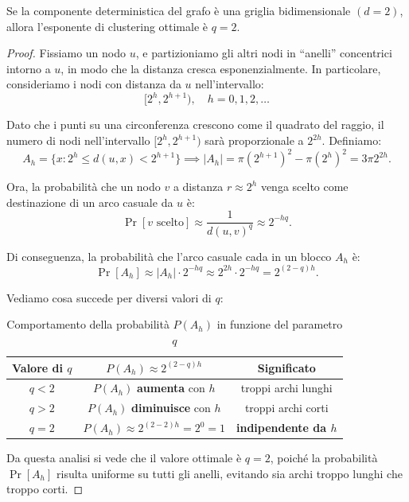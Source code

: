 \begin{teorema}[Informale: Coefficiente di clustering ottimale per $d = 2$]
    Se la componente deterministica del grafo è una griglia bidimensionale $(d = 2)$, allora l'esponente di clustering ottimale è $q = 2$.
\end{teorema}
\begin{proof}
    Fissiamo un nodo $u$, e partizioniamo gli altri nodi in “anelli” concentrici intorno a $u$, in modo che la distanza cresca esponenzialmente.  
    In particolare, consideriamo i nodi con distanza da $u$ nell'intervallo:
    \[
    [2^h, 2^{h+1}), \quad h = 0, 1, 2, \dots
    \]
    
    Dato che i punti su una circonferenza crescono come il quadrato del raggio, il numero di nodi nell'intervallo $[2^h, 2^{h+1})$ sarà proporzionale a $2^{2h}$. Definiamo:
    \[
    A_h = \{x : 2^h \leq d(u,x) < 2^{h+1}\} \implies |A_h| = \pi (2^{h+1})^2 - \pi (2^h)^2 = 3 \pi 2^{2h}.
    \]
    
    Ora, la probabilità che un nodo $v$ a distanza $r \approx 2^h$ venga scelto come destinazione di un arco casuale da $u$ è:
    \[
    \Pr[v \text{ scelto}] \approx \frac{1}{d(u,v)^q} \approx 2^{-hq}.
    \]
    
    Di conseguenza, la probabilità che l'arco casuale cada in un blocco $A_h$ è:
    \[
    \Pr[A_h] \approx |A_h| \cdot 2^{-hq} \approx 2^{2h} \cdot 2^{-hq} = 2^{(2-q)h}.
    \]
    
    Vediamo cosa succede per diversi valori di $q$:
    \renewcommand{\arraystretch}{1.5}
    \begin{table}[h!]
    \centering
    \begin{tabular}{|c|c|c|}
    \hline
    \textbf{Valore di $q$} & $P(A_h) \approx 2^{(2-q)h}$ & \textbf{Significato} \\
    \hline
    $q < 2$ & $P(A_h)$ \textbf{aumenta} con $h$ & troppi archi lunghi \\
    \hline
    $q > 2$ & $P(A_h)$ \textbf{diminuisce} con $h$ & troppi archi corti \\
    \hline
    $q = 2$ & $P(A_h) \approx 2^{(2-2)h} = 2^0 = 1$ & \textbf{indipendente da $h$} \\
    \hline
    \end{tabular}
    \caption{Comportamento della probabilità $P(A_h)$ in funzione del parametro $q$}
    \end{table}
    
    Da questa analisi si vede che il valore ottimale è $q = 2$, poiché la probabilità $\Pr[A_h]$ risulta uniforme su tutti gli anelli, evitando sia archi troppo lunghi che troppo corti.
\end{proof}

